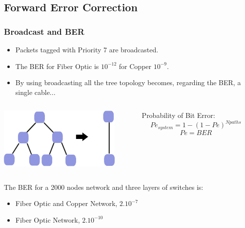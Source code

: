 \documentclass[]{beamer}
\begin{document}
\subsection{Forward Error Correction}
\begin{frame}
\frametitle{Broadcast and BER}
\begin{itemize}
\item Packets tagged with Priority 7 are broadcasted. 
\item The BER for Fiber Optic is $10^{-12}$ for Copper $10^{-9}$. 
\item By using broadcasting all the tree topology becomes, regarding the BER, a single cable...  
\end{itemize}

\begin{center}

\begin{columns}
  \begin{column}[c]{5cm}  %

	  \includegraphics[width=6cm,keepaspectratio]{robustness/broadcast_ber.jpg}


  \end{column}

  \begin{column}[r]{5cm}  %
Probability of Bit Error:
	\begin{equation}
		Pe_{system} = 1 - (1 - Pe)^{N{paths}} \nonumber 
	\end{equation}	    
	\begin{equation}
		Pe = BER \nonumber
	\end{equation}  
  \end{column}
 
\end{columns}

\end{center}

The BER for a 2000 nodes network and three layers of switches is:
\begin{itemize}
	\item Fiber Optic and Copper  Network, $2.10^{-7}$
	\item Fiber Optic Network,  $2.10^{-10}$
\end{itemize}
\end{frame}
\end{document}
